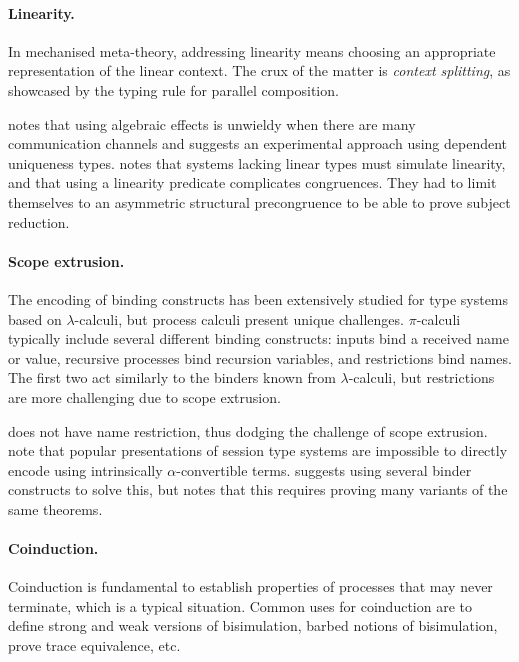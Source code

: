 \documentclass[runningheads]{llncs}
\begin{document}
\paragraph{Linearity.}
In mechanised meta-theory, addressing linearity means choosing an appropriate representation of the linear context.
The crux of the matter is \emph{context splitting}, as showcased by the typing rule for parallel composition.

\cite{Brady2017} notes that using algebraic effects is unwieldy when there are many communication channels and suggests an experimental approach using dependent uniqueness types.
\cite{Zalakain2019} notes that systems lacking linear types must simulate linearity, and that using a linearity predicate complicates congruences.
They had to limit themselves to an asymmetric structural precongruence to be able to prove subject reduction.


\paragraph{Scope extrusion.}
The encoding of binding constructs has been extensively studied for type systems based on $\lambda$-calculi, but process calculi present unique challenges.
$\pi$-calculi typically include several different binding constructs: inputs bind a received name or value, recursive processes bind recursion variables, and restrictions bind names.
The first two act similarly to the binders known from $\lambda$-calculi, but restrictions are more challenging due to scope extrusion.


\cite{Maksimovic2015} does not have name restriction, thus dodging the challenge of scope extrusion.
\cite{Castro-Perez2021,Castro2020} note that popular presentations of session type systems are impossible to directly encode using intrinsically \(\alpha\)-convertible terms.
\cite{Castro2020} suggests using several binder constructs to solve this, but notes that this requires proving many variants of the same theorems.

\paragraph{Coinduction.} 
Coinduction is fundamental to establish properties of processes that
may never terminate, which is a typical situation.
Common uses for coinduction are to define strong and weak versions of
bisimulation, barbed notions of bisimulation, prove trace equivalence,
etc.
\end{document}
